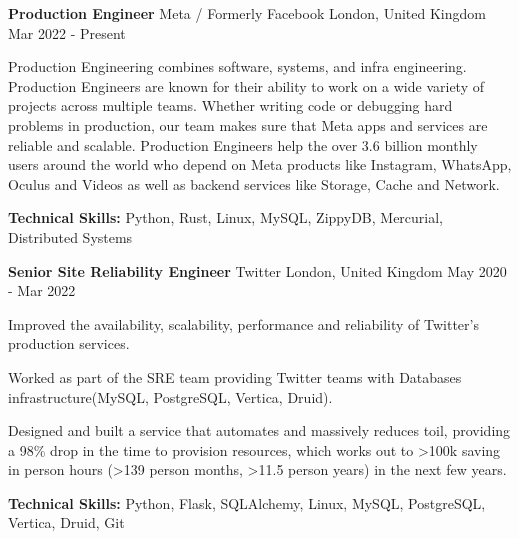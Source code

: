 

\begin{cventries}

  \cventry
    {\textbf{Production Engineer}} %
    {Meta / Formerly Facebook} %
    {London, United Kingdom} %
    {Mar 2022 - Present} %
    {
      \begin{cvitems} %
      \item {Production Engineering combines software, systems, and infra engineering. Production Engineers
      are known for their ability to work on a wide variety of projects across multiple teams.
      Whether writing code or debugging hard problems in production, our team makes sure that Meta
      apps and services are reliable and scalable. Production Engineers help the over 3.6 billion
      monthly users around the world who depend on Meta products like Instagram, WhatsApp, Oculus
      and Videos as well as backend services like Storage, Cache and Network.}
      \item {\textbf{Technical Skills:} Python, Rust, Linux, MySQL, ZippyDB, Mercurial, Distributed Systems}
      \end{cvitems}
    }

  \cventry
    {\textbf{Senior Site Reliability Engineer}} %
    {Twitter} %
    {London, United Kingdom} %
    {May 2020 - Mar 2022} %
    {
      \begin{cvitems} %
      \item {Improved the availability, scalability, performance and reliability of Twitter’s production services.}
      \item {Worked as part of the SRE team providing Twitter teams with Databases infrastructure(MySQL, PostgreSQL, Vertica, Druid).}
      \item {Designed and built a service that automates and massively reduces toil, providing a
          98\% drop in the time to provision resources, which works out to >100k saving in person
          hours (>139 person months, >11.5 person years) in the next few years.}
      \item {\textbf{Technical Skills:} Python, Flask, SQLAlchemy, Linux, MySQL, PostgreSQL, Vertica, Druid, Git}
      \end{cvitems}
    }


\end{cventries}
